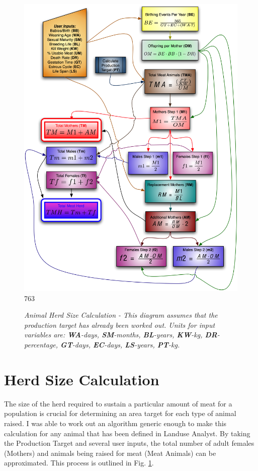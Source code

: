 \begin{figure}[htbp]
    \includegraphics[scale=.4]{./images/animalHerdSize.jpg}
763
    \caption[Animal Herd Size Calculation]{\label{fig:herdSize}\textit{Animal
Herd Size Calculation - This diagram assumes that the production target has
already been worked out.  Units for input variables are: \textbf{WA}-days,
\textbf{SM}-months, \textbf{BL}-years, \textbf{KW}-kg, \textbf{DR}-percentage,
\textbf{GT}-days, \textbf{EC}-days, \textbf{LS}-years, \textbf{PT}-kg.}}
\end{figure}

\section{Herd Size Calculation}
The size of the herd required to sustain a particular amount of meat for a
population is crucial for determining an area target for each type of animal
raised.  I was able to work out an algorithm generic enough to make this
calculation for any animal that has been defined in Landuse Analyst.  By taking
the Production Target and several user inputs, the total number of adult females
(Mothers) and animals being raised for meat (Meat Animals) can be approximated. 
This process is outlined in Fig. \ref{fig:herdSize}.


